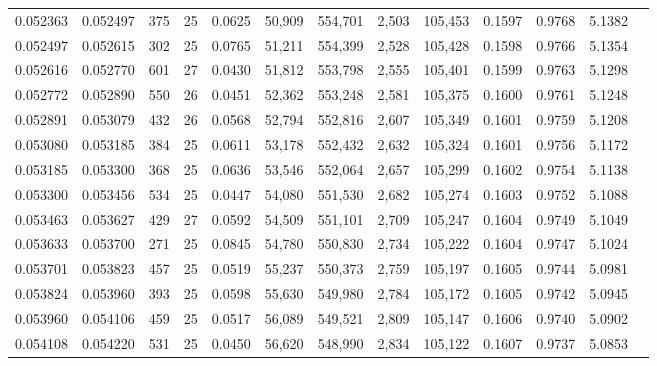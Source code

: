 \begin{tabular}{rrrrrrrrrrrrr}
0.052363 & 0.052497 & 375 &  25 &                                     0.0625 &  50,909 & 554,701 &   2,503 & 105,453 & 0.1597 & 0.9768 & 5.1382 \\
0.052497 & 0.052615 & 302 &  25 &                                     0.0765 &  51,211 & 554,399 &   2,528 & 105,428 & 0.1598 & 0.9766 & 5.1354 \\
0.052616 & 0.052770 & 601 &  27 &                                     0.0430 &  51,812 & 553,798 &   2,555 & 105,401 & 0.1599 & 0.9763 & 5.1298 \\
0.052772 & 0.052890 & 550 &  26 &                                     0.0451 &  52,362 & 553,248 &   2,581 & 105,375 & 0.1600 & 0.9761 & 5.1248 \\
0.052891 & 0.053079 & 432 &  26 &                                     0.0568 &  52,794 & 552,816 &   2,607 & 105,349 & 0.1601 & 0.9759 & 5.1208 \\
0.053080 & 0.053185 & 384 &  25 &                                     0.0611 &  53,178 & 552,432 &   2,632 & 105,324 & 0.1601 & 0.9756 & 5.1172 \\
0.053185 & 0.053300 & 368 &  25 &                                     0.0636 &  53,546 & 552,064 &   2,657 & 105,299 & 0.1602 & 0.9754 & 5.1138 \\
0.053300 & 0.053456 & 534 &  25 &                                     0.0447 &  54,080 & 551,530 &   2,682 & 105,274 & 0.1603 & 0.9752 & 5.1088 \\
0.053463 & 0.053627 & 429 &  27 &                                     0.0592 &  54,509 & 551,101 &   2,709 & 105,247 & 0.1604 & 0.9749 & 5.1049 \\
0.053633 & 0.053700 & 271 &  25 &                                     0.0845 &  54,780 & 550,830 &   2,734 & 105,222 & 0.1604 & 0.9747 & 5.1024 \\
0.053701 & 0.053823 & 457 &  25 &                                     0.0519 &  55,237 & 550,373 &   2,759 & 105,197 & 0.1605 & 0.9744 & 5.0981 \\
0.053824 & 0.053960 & 393 &  25 &                                     0.0598 &  55,630 & 549,980 &   2,784 & 105,172 & 0.1605 & 0.9742 & 5.0945 \\
0.053960 & 0.054106 & 459 &  25 &                                     0.0517 &  56,089 & 549,521 &   2,809 & 105,147 & 0.1606 & 0.9740 & 5.0902 \\
0.054108 & 0.054220 & 531 &  25 &                                     0.0450 &  56,620 & 548,990 &   2,834 & 105,122 & 0.1607 & 0.9737 & 5.0853 \\

\end{tabular}
